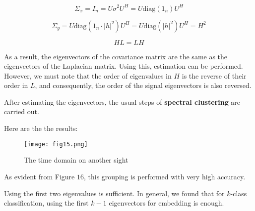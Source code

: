\documentclass{article}
\begin{document}
\begin{enumerate}
    \[
    \Sigma_x = I_n = U \sigma^2 U^H = U \text{diag}(1_n) U^H
    \]
    
    \[
    \Sigma_y = U \text{diag}(1_n \cdot |h|^2) U^H = U \text{diag}(|h|^2) U^H = H^2
    \]
    
    \[
    H L = L H
    \]
    
    As a result, the eigenvectors of the covariance matrix are the same as the eigenvectors of the Laplacian matrix. Using this, estimation can be performed. However, we must note that the order of eigenvalues in \( H \) is the reverse of their order in \( L \), and consequently, the order of the signal eigenvectors is also reversed.
    
    After estimating the eigenvectors, the usual steps of \textbf{spectral clustering} are carried out.

    \newpage

    Here are the the results:
    \begin{figure}[h!]
        \centering
        \texttt{[image: fig15.png]} 
        \caption{The time domain on another sight}
        \label{fig:gr16}
    \end{figure}
    
    
    As evident from Figure \( 16 \), this grouping is performed with very high accuracy.  
    
    Using the first two eigenvalues is sufficient. In general, we found that for \( k \)-class classification, using the first \( k-1 \) eigenvectors for embedding is enough.
    
    



\end{enumerate}
\end{document}
